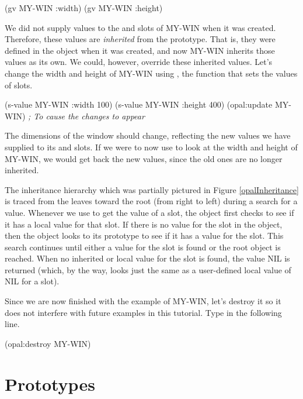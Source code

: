 \begin{programexample}
(gv MY-WIN :width)
(gv MY-WIN :height)
\end{programexample}

We did not supply values to the  and  slots of
MY-WIN when it was created.  Therefore, these values are {\it inherited}
from the prototype.  That is, they were defined in the
 object when it was created, and now MY-WIN
inherits those values as its own.  We could, however, override these
inherited values.  Let's change the width and height of MY-WIN using
, the function that sets the values of slots.

\begin{programexample}
(s-value MY-WIN :width 100)
(s-value MY-WIN :height 400)
(opal:update MY-WIN)  {\it ; To cause the changes to appear}
\end{programexample}

The dimensions of the window should change, reflecting the new values
we have supplied to its  and  slots.  If we
were to now use  to look at the width and height of
MY-WIN, we would get back the new values, since the old ones are no
longer inherited.

The inheritance hierarchy which was partially pictured in Figure
\ref{opalInheritance} is traced from the leaves toward the root
(from right to left) during a search for a value.
Whenever we use  to get the value of a slot, the object
first checks to see if it has a local value for that slot.  If there
is no value for the slot in the object, then the object looks to its
prototype to see if it has a value for the slot.  This search
continues until either a value for the slot is found or the root
object is reached.  When no inherited or local value for the slot is
found, the value NIL is returned (which, by the way, looks just the
same as a user-defined local value of NIL for a slot).

Since we are now finished with the example of MY-WIN, let's destroy it
so it does not interfere with future examples in this tutorial.  Type
in the following line.

\begin{programexample}
(opal:destroy MY-WIN)
\end{programexample}


\section{Prototypes}
\label{prototypes}

